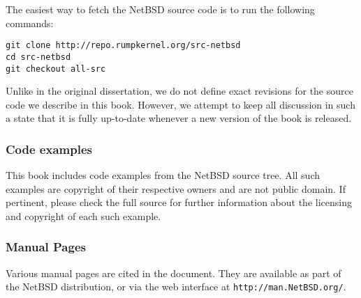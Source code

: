 The easiest way to fetch the NetBSD source code is to run the following
commands:

\begin{verbatim}
git clone http://repo.rumpkernel.org/src-netbsd
cd src-netbsd
git checkout all-src
\end{verbatim}

Unlike in the original dissertation, we do not define exact revisions
for the source code we describe in this book.  However, we attempt to
keep all discussion in such a state that it is fully up-to-date whenever
a new version of the book is released.

\subsubsection*{Code examples}

This book includes code examples from the NetBSD source
tree.  All such examples are copyright of their respective owners
and are not public domain.  If pertinent, please check the full
source for further information about the licensing and copyright
of each such example.

\subsubsection{Manual Pages}

Various manual pages are cited in the document.  They are available
as part of the NetBSD distribution, or via the web interface
at \texttt{http://man.NetBSD.org/}.
